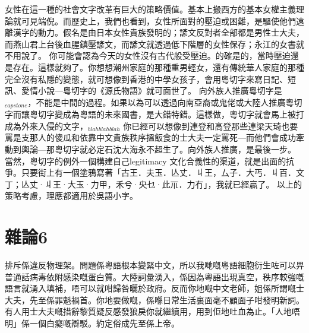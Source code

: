 女性在這一種的社會文字改革有巨大的策略價值。基本上搬西方的基本女權主義理論就可見端倪。而歷史上，我們也看到，女性所面對的壓迫或困難，是驅使他們遠離漢字的動力。假名是由日本女性貴族發明的；諺文反對者全部都是男性士大夫，而燕山君上台後血腥鎮壓諺文，而諺文就透過低下階層的女性保存；永江的女書就不用說了。
你可能會認為今天的女性沒有古代般受壓迫。的確是的，當時壓迫還是存在。這樣就夠了。你想想潮州家庭的那種重男輕女，還有傳統華人家庭的那種完全沒有私隱的變態，就可想像到香港的中學女孩子，會用粵切字來寫日記、短訊、愛情小說—粵切字的《源氏物語》就可面世了。
向外族人推廣粵切字是$_{capstone}$，不能是中間的過程。如果以為可以透過向南亞裔或鬼佬或大陸人推廣粵切字而讓粵切字變成為粵語的未來國書，是大錯特錯。這樣做，粵切字就會馬上被打成為外來入侵的文字，$_{blahblahblah}$ 你已經可以想像到連登和高登那些連梁天琦也要罵是支那人的傻瓜和依靠中文貴族秩序搵飯食的士大夫一定罵死—而他們會成功牽動到輿論—那粵切字就必定石沈大海永不超生了。向外族人推廣，是最後一步。
當然，粵切字的例外一個構建自己legitimacy 文化合義性的渠道，就是出面的抗爭。只要街上有一個塗鴉寫著「古王．夫玉．亾丈．丩王，厶子．大丐．丩百．文丁；亾丈·丩王·大玉·力甲，禾兮·央乜·此𥘅．力冇」，我就已經贏了。
以上的策略考慮，理應都適用於吳語小字。


\section{雜論6}
排斥係違反物理架。問題係粵語根本變緊中文，所以我哋嘅粵語細胞衍生咗可以畀普通話病毒依附感染嘅蛋白質。大陸詞彙湧入，係因為粵語出現真空，秩序較強嘅語言就湧入填補，唔可以就咁歸咎曬於政府。反而你地嘅中文老師，姐係所謂嘅士大夫，先至係罪魁禍首。你地要做嘅，係喺日常生活裏面毫不顧面子咁發明新詞。有人用士大夫嘅措辭黎質疑反感發狼戾你就繼續用，用到佢地吐血為止。「人地唔明」係一個白癡嘅辯駁。約定俗成先至係上帝。